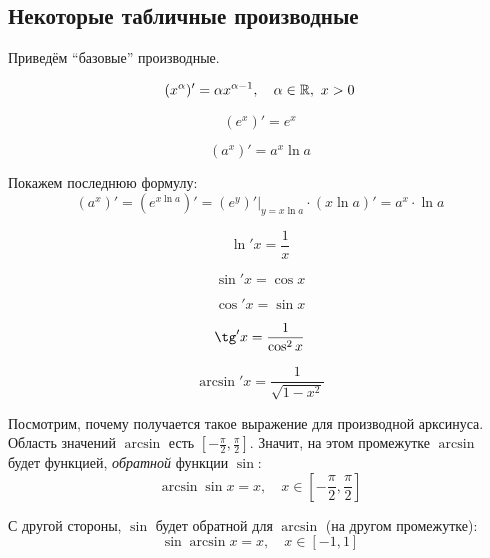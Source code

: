 \documentclass[a4paper,12pt]{article}
\begin{document}
  
  \subsection{Некоторые табличные производные}
  
  Приведём ``базовые'' производные.
  
  \begin{equation}
    (x^{\alpha})' = \alpha x^{\alpha - 1},\quad \alpha \in \RR,\ x > 0  %
  \end{equation}
  
  \begin{equation}
    (e^x)' = e^x
  \end{equation}
  
  \begin{equation}
    (a^x)' = a^x \ln a
  \end{equation}
  
  Покажем последнюю формулу:
  \[
    (a^x)' = \left(e^{x \ln a}\right)' = \left(e^{y}\right)'|_{y = x \ln a} \cdot (x \ln a)' = a^x \cdot \ln a
  \]
  
  \begin{equation}
    \ln' x = \frac{1}{x}
  \end{equation}
  
  \begin{equation}
    \sin'{x} = \cos{x}
  \end{equation}
  
  \begin{equation}
    \cos'{x} = \sin{x}
  \end{equation}
  
  \begin{equation}
    \tg'{x} = \frac{1}{\cos^2{x}}
  \end{equation}
  
  \begin{equation}\label{eq:d-arcsin}
    \arcsin'{x} = \frac{1}{\sqrt{1 - x^2}}
  \end{equation}
  
  Посмотрим, почему получается такое выражение для производной арксинуса.
  Область значений $\arcsin$ есть $\left[{-}\frac{\pi}{2}, \frac{\pi}{2}\right]$.
  Значит, на этом промежутке $\arcsin$ будет функцией, \emph{обратной} функции $\sin$:
  \[
    \arcsin \sin x = x,\quad x \in \left[{-}\frac{\pi}{2}, \frac{\pi}{2}\right]
  \]
  
  С другой стороны, $\sin$ будет обратной для $\arcsin$ (на другом промежутке):
  \[
    \sin \arcsin x = x,\quad x \in [-1, 1]
  \]
  
\end{document}
